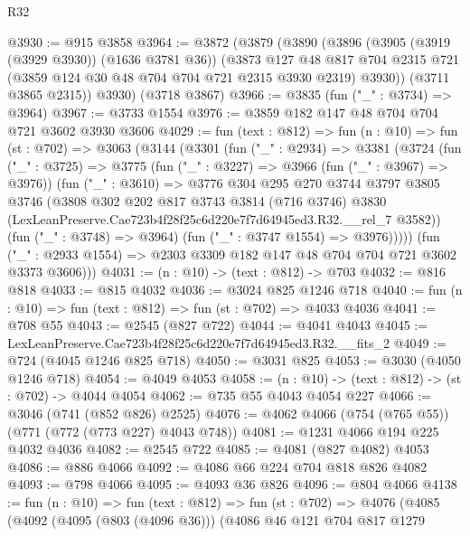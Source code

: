 \begin{lexlean}{R32}
\begin{coremodule}
@3930 := @915 @3858
@3964 := @3872
    (@3879
      (@3890
        (@3896
          (@3905 (@3919 (@3929 @3930)) (@1636 @3781 @36))
          (@3873
            @127
            @48
            @817
            @704
            @2315
            @721
            (@3859 @124 @30 @48 @704 @704 @721 @2315 @3930 @2319)
            @3930))
        (@3711 @3865 @2315))
      @3930)
    (@3718 @3867)
@3966 := @3835 (fun ("_" : @3734) => @3964)
@3967 := @3733 @1554
@3976 := @3859 @182 @147 @48 @704 @704 @721 @3602 @3930 @3606
@4029 := fun (text : @812) =>
  fun (n : @10) =>
  fun (st : @702) =>
  @3063
    (@3144
      (@3301
        (fun ("_" : @2934) =>
        @3381
          (@3724
            (fun ("_" : @3725) =>
            @3775
              (fun ("_" : @3227) => @3966 (fun ("_" : @3967) => @3976))
              (fun ("_" : @3610) =>
              @3776
                @304
                @295
                @270
                @3744
                @3797
                @3805
                @3746
                (@3808
                  @302
                  @202
                  @817
                  @3743
                  @3814
                  (@716 @3746)
                  @3830
                  (LexLeanPreserve.Cae723b4f28f25c6d220e7f7d64945ed3.R32.__rel_7 @3582))
                (fun ("_" : @3748) => @3964)
                (fun ("_" : @3747 @1554) => @3976)))))
        (fun ("_" : @2933 @1554) => @2303 @3309 @182 @147 @48 @704 @704 @721 @3602 @3373 @3606)))
@4031 := (n : @10) -> (text : @812) -> @703
@4032 := @816 @818
@4033 := @815 @4032
@4036 := @3024 @825 @1246 @718
@4040 := fun (n : @10) => fun (text : @812) => fun (st : @702) => @4033 @4036
@4041 := @708 @55
@4043 := @2545 (@827 @722)
@4044 := @4041 @4043
@4045 := LexLeanPreserve.Cae723b4f28f25c6d220e7f7d64945ed3.R32.__fits_2
@4049 := @724 (@4045 @1246 @825 @718)
@4050 := @3031 @825
@4053 := @3030 (@4050 @1246 @718)
@4054 := @4049 @4053
@4058 := (n : @10) -> (text : @812) -> (st : @702) -> @4044 @4054
@4062 := @735 @55 @4043 @4054 @227
@4066 := @3046 (@741 (@852 @826) @2525)
@4076 := @4062 @4066 (@754 (@765 @55)) (@771 (@772 (@773 @227) @4043 @748))
@4081 := @1231 @4066 @194 @225 @4032 @4036
@4082 := @2545 @722
@4085 := @4081 (@827 @4082) @4053
@4086 := @886 @4066
@4092 := @4086 @66 @224 @704 @818 @826 @4082
@4093 := @798 @4066
@4095 := @4093 @36 @826
@4096 := @804 @4066
@4138 := fun (n : @10) =>
  fun (text : @812) =>
  fun (st : @702) =>
  @4076
    (@4085
      (@4092
        (@4095 (@803 (@4096 @36)))
        (@4086
          @46
          @121
          @704
          @817
          @1279

\end{coremodule}
\end{lexlean}
